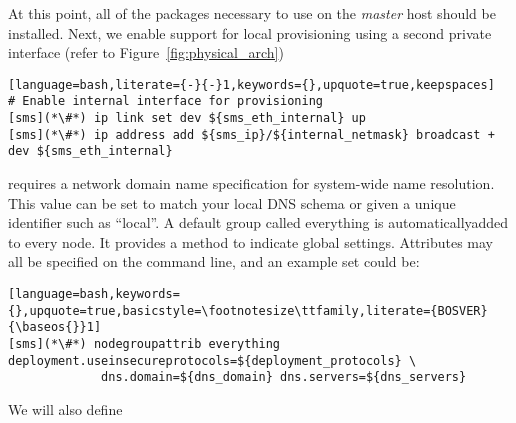 At this point, all of the packages necessary to use \Confluent{} on the {\em master}
host should be installed. Next, we enable support for local provisioning using
a second private interface (refer to Figure~\ref{fig:physical_arch})

\begin{lstlisting}[language=bash,literate={-}{-}1,keywords={},upquote=true,keepspaces]
# Enable internal interface for provisioning
[sms](*\#*) ip link set dev ${sms_eth_internal} up
[sms](*\#*) ip address add ${sms_ip}/${internal_netmask} broadcast + dev ${sms_eth_internal}

\end{lstlisting}


\noindent \Confluent{} requires a network domain name specification for system-wide name
resolution. This value can be set to match your local DNS schema or given a
unique identifier such as ``local''. A default group called everything is 
automaticallyadded to every node. It provides a method to indicate global settings.
Attributes may all be specified on the command line, and an example set could be:

\begin{lstlisting}[language=bash,keywords={},upquote=true,basicstyle=\footnotesize\ttfamily,literate={BOSVER}{\baseos{}}1]
[sms](*\#*) nodegroupattrib everything deployment.useinsecureprotocols=${deployment_protocols} \ 
             dns.domain=${dns_domain} dns.servers=${dns_servers}
\end{lstlisting}

\noindent We will also define 